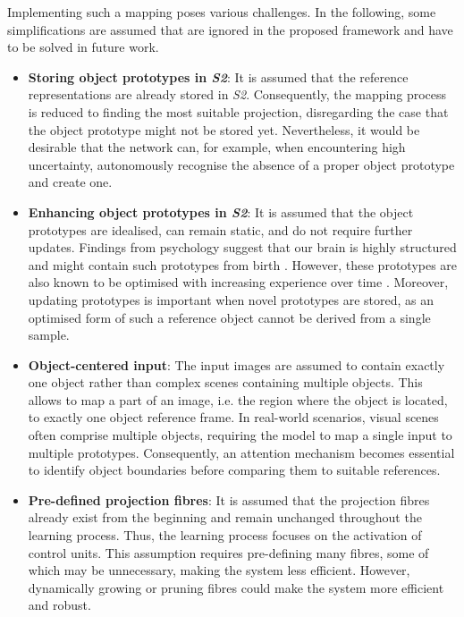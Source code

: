 Implementing such a mapping poses various challenges.
In the following, some simplifications are assumed that are ignored in the proposed framework and have to be solved in future work.
\begin{itemize}
    \item \textbf{Storing object prototypes in \emph{S2}}: It is assumed that the reference representations are already stored in \emph{S2}. Consequently, the mapping process is reduced to finding the most suitable projection, disregarding the case that the object prototype might not be stored yet. Nevertheless, it would be desirable that the network can, for example, when encountering high uncertainty, autonomously recognise the absence of a proper object prototype and create one.
    \item \textbf{Enhancing object prototypes in \emph{S2}}: It is assumed that the object prototypes are idealised, can remain static, and do not require further updates. 
    Findings from psychology suggest that our brain is highly structured and might contain such prototypes from birth . However, these prototypes are also known to be optimised with increasing experience over time \cite{simion_face_2015}.
    Moreover, updating prototypes is important when novel prototypes are stored, as an optimised form of such a reference object cannot be derived from a single sample.
    \item \textbf{Object-centered input}: The input images are assumed to contain exactly one object rather than complex scenes containing multiple objects. This allows to map a part of an image, i.e. the region where the object is located, to exactly one object reference frame. In real-world scenarios, visual scenes often comprise multiple objects, requiring the model to map a single input to multiple prototypes. Consequently, an attention mechanism becomes essential to identify object boundaries before comparing them to suitable references.
    \item \textbf{Pre-defined projection fibres}: It is assumed that the projection fibres already exist from the beginning and remain unchanged throughout the learning process. Thus, the learning process focuses on the activation of control units. This assumption requires pre-defining many fibres, some of which may be unnecessary, making the system less efficient. However, dynamically growing or pruning fibres could make the system more efficient and robust.
\end{itemize}

